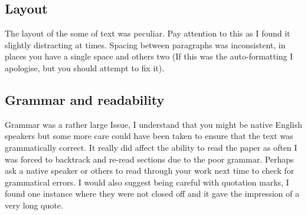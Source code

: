 \documentclass[conference]{IEEEtran}
\begin{document}
\subsection*{Layout}
The layout of the some of text was peculiar. Pay attention to this as I found it slightly distracting at times. Spacing between paragraphs was inconsistent, in places you have a single space and others two (If this was the auto-formatting I apologise, but you should attempt to fix it). 
\subsection*{Grammar and readability}
Grammar was a rather large Issue, I understand that you might be native English speakers but some more care could have been taken to ensure that the text was grammatically correct. It really did affect the ability to read the paper as often I was forced to backtrack and re-read sections due to the poor grammar. Perhaps ask a native speaker or others to read through your work next time to check for grammatical errors. I would also suggest being careful with quotation marks, I found one instance where they were not closed off and it gave the impression of a very long quote.

\end{document}
